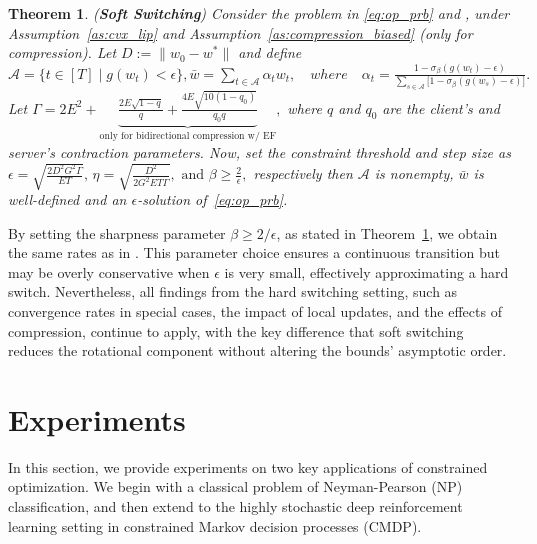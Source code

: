 \documentclass{article} %
\newtheorem{theorem}{Theorem}[]
\def\A{{\mathcal A}}
\begin{document}
\begin{theorem}{(\textbf{Soft Switching})}
\label{thm:fedssgm_unified}
Consider the problem in \ref{eq:op_prb} and , under Assumption~\ref{as:cvx_lip} and Assumption~\ref{as:compression_biased} (only for compression). Let $D := \|w_0 - w^*\|$ and define
$
\A = \{t \in [T] \;|\; g(w_t) < \epsilon\}, 
\bar{w} = \sum_{t \in \A} \alpha_t w_t,
\quad
where \quad
\alpha_t = \frac{1 - \sigma_\beta(g(w_t) - \epsilon)}{\sum_{s \in \A} \big[ 1 - \sigma_\beta(g(w_s) - \epsilon) \big]}.
$
Let
$
\Gamma = 2E^2 
+ \underbrace{\frac{2E\sqrt{1-q}}{q} + \frac{4E\sqrt{10(1-q_0)}}{q_0 q}}_{\text{only for bidirectional compression w/ EF}},
$
where $q$ and $q_0$ are the client's and server's contraction parameters.  
Now, set the constraint threshold and step size  as
$
\epsilon = \sqrt{\frac{2 D^2 G^2 \Gamma}{E T}} \text{, }  
\eta = \sqrt{\frac{D^2}{2 G^2 E T \Gamma}}, 
\text{ and } 
\beta \geq \frac{2}{\epsilon},$ respectively
then $\A$ is nonempty, $\bar{w}$ is well-defined and an $\epsilon$-solution of~\ref{eq:op_prb}.
\end{theorem}

By setting the sharpness parameter $\beta \geq 2/\epsilon$, as stated in Theorem~\ref{thm:fedssgm_unified}, we obtain the same rates as in . This parameter choice ensures a continuous transition but may be overly conservative when $\epsilon$ is very small, effectively approximating a hard switch. Nevertheless, all findings from the hard switching setting, such as convergence rates in special cases, the impact of local updates, and the effects of compression, continue to apply, with the key difference that soft switching reduces the rotational component without altering the bounds' asymptotic order.

\vspace{-1mm}
\section{Experiments}\label{sec:exp}
\vspace{-1mm}
In this section, we provide experiments on two key applications of constrained optimization. We begin with a classical problem of Neyman-Pearson (NP) classification, and then extend to the highly stochastic deep reinforcement learning setting in constrained Markov decision processes (CMDP). %
\end{document}
